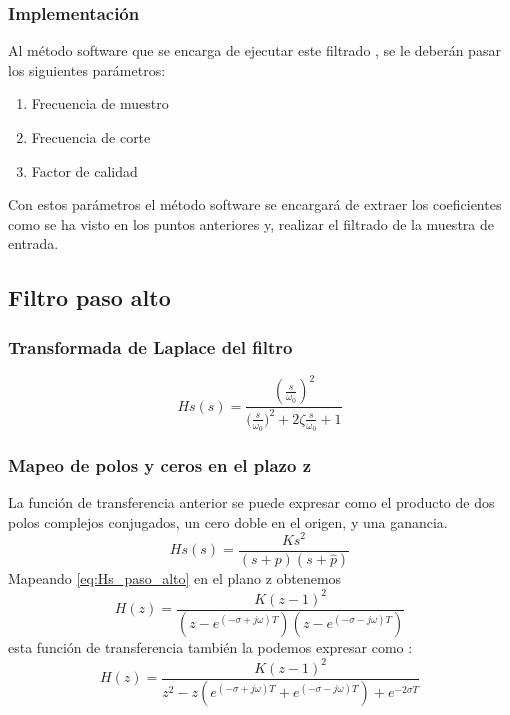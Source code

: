 \documentclass[titlepage]{article}
\begin{document}
\subsubsection{Implementación}
Al método software que se encarga de ejecutar este filtrado , se le deberán pasar los siguientes parámetros:
\begin{enumerate}
	\item Frecuencia de muestro 
	\item Frecuencia de corte
	\item Factor de calidad
\end{enumerate}
Con estos parámetros el método software se encargará de extraer los coeficientes como se ha visto en los puntos anteriores y, realizar el filtrado de la muestra de entrada.









\subsection{Filtro paso alto}
\subsubsection{Transformada de Laplace del filtro}
\begin{equation}
Hs(s)=\frac{(\displaystyle\frac{s}{\omega_0})^2}{\displaystyle{(\frac{s}{\omega_0}})^2+2\zeta\frac{s}{\omega_0}+1}
\end{equation}
\subsubsection{Mapeo de polos y ceros en el plazo z}
La función de transferencia anterior se puede expresar como el producto de dos polos complejos conjugados, un cero doble en el origen, y una ganancia.
\begin{equation}
\label{eq:Hs_paso_alto}Hs(s)=\frac{Ks^2}{\displaystyle(s+p)(s+\hat{p})}
\end{equation}
Mapeando \ref{eq:Hs_paso_alto} en el plano z obtenemos
\begin{equation}
H(z)=\frac{K(z-1)^2}{\displaystyle(z-e^{(-\sigma+j\omega)T})(z-e^{(-\sigma-j\omega)T})}
\end{equation}
esta función de transferencia también la podemos expresar como :
\begin{equation}
H(z)=\frac{K(z-1)^2}{z^2-z(e^{(-\sigma+j\omega)T}+e^{(-\sigma-j\omega)T}) + e^{-2{\sigma}T}}
\end{equation}
\end{document}
